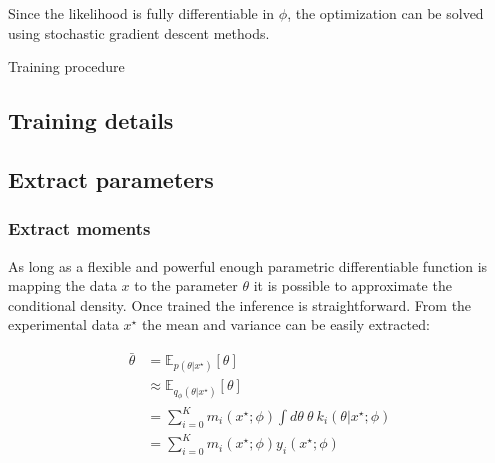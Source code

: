 Since the likelihood is fully differentiable in $\phi$, the optimization can be solved using stochastic gradient descent methods.

\begin{algorithm}[H]
 \caption{Training procedure}
\end{algorithm}



\subsection{Training details} %
\label{sub:training_details}




\subsection{Extract parameters} %
\label{sub:extract_parameters}




\subsubsection{Extract moments} %
\label{ssub:extract_moments}

As long as a flexible and powerful enough parametric differentiable function is mapping the data $x$ to the parameter $\theta$ it is possible to approximate the conditional density.
Once trained the inference is straightforward.
From the experimental data $x^\star$ the mean and variance can be easily extracted:

\begin{align}
    \bar \theta & = \mathbb E_{p(\theta | x^\star)}[\theta] \\
    & \approx \mathbb E_{q_\phi(\theta | x^\star)}[\theta] \\
    & = \sum_{i=0}^K m_i(x^\star ; \phi) \int d\theta ~ \theta ~ k_i(\theta | x^\star ; \phi) \\
    & = \sum_{i=0}^K m_i(x^\star ; \phi) y_i(x^\star ; \phi)
\end{align}

